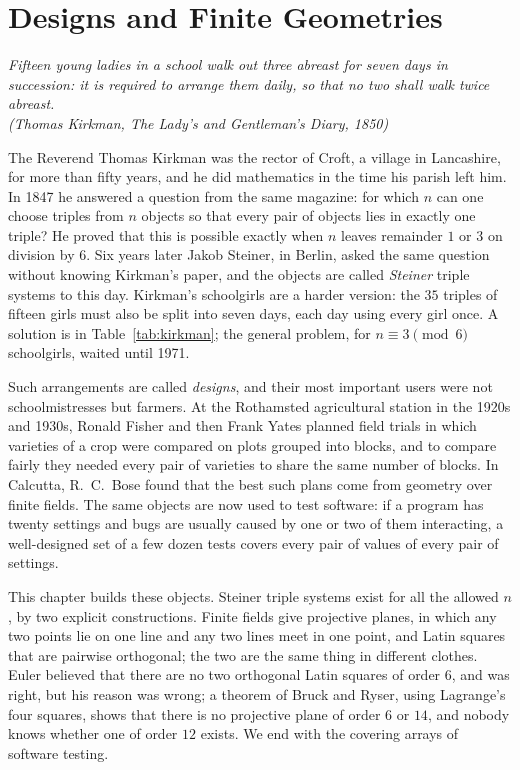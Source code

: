 \chapter{Designs and Finite Geometries}

\begin{center}\itshape
Fifteen young ladies in a school walk out three abreast for seven days in succession: it is required to arrange them daily, so that no two shall walk twice abreast.\\
\upshape(Thomas Kirkman, \emph{The Lady's and Gentleman's Diary}, 1850)
\end{center}

The Reverend Thomas Kirkman was the rector of Croft, a village in Lancashire, for more than fifty years, and he did
mathematics in the time his parish left him. In 1847 he answered a question from the same magazine: for which $n$ can one
choose triples from $n$ objects so that every pair of objects lies in exactly one triple? He proved that this is possible
exactly when $n$ leaves remainder $1$ or $3$ on division by $6$. Six years later Jakob Steiner, in Berlin, asked the same question
without knowing Kirkman's paper, and the objects are called \emph{Steiner} triple systems to this day. Kirkman's schoolgirls are a
harder version: the $35$ triples of fifteen girls must also be split into seven days, each day using every girl once. A solution is
in Table~\ref{tab:kirkman}; the general problem, for $n\equiv3\pmod 6$ schoolgirls, waited until 1971.

Such arrangements are called \emph{designs}, and their most important users were not schoolmistresses but farmers. At the Rothamsted
agricultural station in the 1920s and 1930s, Ronald Fisher and then Frank Yates planned field trials in which varieties of a crop were compared on plots
grouped into blocks, and to compare fairly they needed every pair of varieties to share the same number of blocks. In Calcutta, R.~C.~Bose
found that the best such plans come from geometry over finite fields. The same objects are now used to test software: if a program has
twenty settings and bugs are usually caused by one or two of them interacting, a well-designed set of a few dozen tests covers every pair
of values of every pair of settings.

This chapter builds these objects. Steiner triple systems exist for all the allowed $n$, by two explicit constructions. Finite fields give
projective planes, in which any two points lie on one line and any two lines meet in one point, and Latin squares that are pairwise
orthogonal; the two are the same thing in different clothes. Euler believed that there are no two orthogonal Latin squares of order $6$,
and was right, but his reason was wrong; a theorem of Bruck and Ryser, using Lagrange's four squares, shows that there is no projective
plane of order $6$ or $14$, and nobody knows whether one of order $12$ exists. We end with the covering arrays of software testing.

